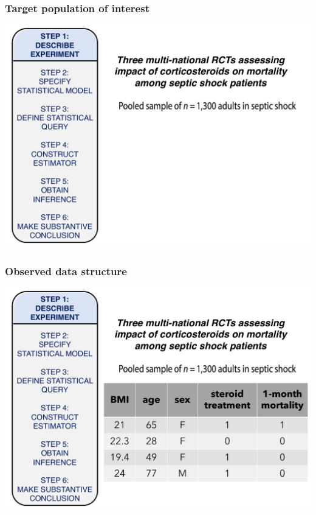 \documentclass[t]{beamer}
\begin{document}
\begin{frame}
  \frametitle{Target population of interest}
  \vspace{-20pt}
  \begin{center}
  \includegraphics[width = 1.05\textwidth]{figures/data_1.pdf}
  \end{center}
\end{frame}

\begin{frame}
  \frametitle{Observed data structure}
  \vspace{-20pt}
  \begin{center}
  \includegraphics[width = 1.05\textwidth]{figures/data_table.pdf}
  \end{center}
\end{frame}
\end{document}
